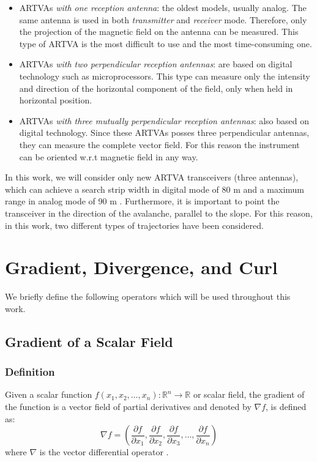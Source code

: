 \begin{itemize}
    \item ARTVAs \textit{with one reception antenna}: the oldest models, usually analog. The same antenna is used in both \textit{transmitter} and \textit{receiver} mode. Therefore, only the projection of the magnetic field on the antenna can be measured. This type of ARTVA is the most difficult to use and the most time-consuming one.
    \item ARTVAs \textit{with two perpendicular reception antennas}: are based on digital technology such as microprocessors. This type can measure only the intensity and direction of the horizontal component of the field, only when held in horizontal position.
    \item ARTVAs \textit{with three mutually perpendicular reception antennas}: also based on digital technology. Since these ARTVAs posses three perpendicular antennas, they can measure the complete vector field. For this reason the instrument can be oriented w.r.t magnetic field in any way.
\end{itemize}

In this work, we will consider only new ARTVA transceivers (three antennas), which can achieve a search strip width in digital mode of 80 m and a maximum range in analog mode of 90 m \cite{manual}. Furthermore, it is important to point the transceiver in the direction of the avalanche, parallel to the slope. For this reason, in this work, two different types of trajectories have been considered.


\section{Gradient, Divergence, and Curl} \label{Gradient, Divergence, and Curl}
We briefly define the following operators which will be used throughout this work.

\subsection{Gradient of a Scalar Field}

\subsubsection{Definition}
Given a scalar function \( f(x_1, x_2, \ldots, x_n): \mathbb{R}^n \to \mathbb{R} \) or scalar field, the gradient of the function is a vector field of partial derivatives and denoted by \( \nabla f \), is defined as:
\begin{equation}
\nabla f = \left( \frac{\partial f}{\partial x_1}, \frac{\partial f}{\partial x_2}, \frac{\partial f}{\partial x_3}, \ldots, \frac{\partial f}{\partial x_n} \right)
\end{equation}
where \( \nabla \) is the vector differential operator \cite{math-book}.

